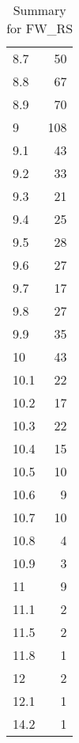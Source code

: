 \begin{table}[ht]
\begin{tabular}{lr}
  8.7 &  50 \\ 
  8.8 &  67 \\ 
  8.9 &  70 \\ 
  9 & 108 \\ 
  9.1 &  43 \\ 
  9.2 &  33 \\ 
  9.3 &  21 \\ 
  9.4 &  25 \\ 
  9.5 &  28 \\ 
  9.6 &  27 \\ 
  9.7 &  17 \\ 
  9.8 &  27 \\ 
  9.9 &  35 \\ 
  10 &  43 \\ 
  10.1 &  22 \\ 
  10.2 &  17 \\ 
  10.3 &  22 \\ 
  10.4 &  15 \\ 
  10.5 &  10 \\ 
  10.6 &   9 \\ 
  10.7 &  10 \\ 
  10.8 &   4 \\ 
  10.9 &   3 \\ 
  11 &   9 \\ 
  11.1 &   2 \\ 
  11.5 &   2 \\ 
  11.8 &   1 \\ 
  12 &   2 \\ 
  12.1 &   1 \\ 
  14.2 &   1 \\ 
   \hline
\end{tabular}
\caption{Summary for FW_RS} 
\label{tab: FW_RS}
\end{table}
